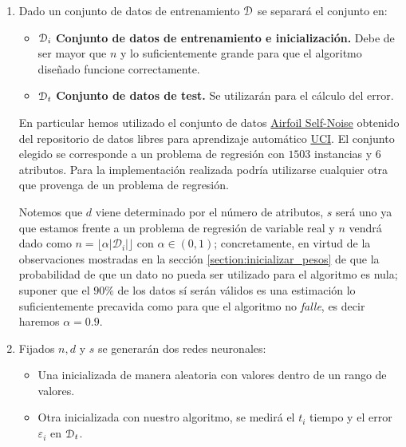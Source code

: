 \begin{enumerate}
\item Dado un conjunto de datos de entrenamiento $\mathcal{D}$  se separará el conjunto en:
\begin{itemize}
    \item $\mathcal{D}_i$ \textbf{Conjunto de 
    datos de entrenamiento e inicialización.} Debe de ser mayor que 
    $n$ y lo suficientemente grande para que el algoritmo diseñado funcione correctamente. 

    \item $\mathcal{D}_t$ \textbf{Conjunto de 
    datos de test.} Se utilizarán para el cálculo del error. 
\end{itemize} 

En particular hemos utilizado el conjunto de datos \href{https://archive.ics.uci.edu/ml/datasets/Airfoil+Self-Noise
    }{
        Airfoil Self-Noise} obtenido del repositorio de datos libres para aprendizaje automático \href{https://archive.ics.uci.edu/ml/datasets.php}{UCI}. 
El conjunto elegido se corresponde a un problema de regresión con $1503$ instancias y $6$ atributos. 
Para la implementación realizada podría utilizarse cualquier otra que provenga de un problema de regresión. 

Notemos que $d$ viene determinado por el número de atributos, 
$s$ será uno ya que estamos frente a un problema 
de regresión de variable real y $n$ vendrá dado como $n = \lfloor \alpha |\mathcal{D}_i| \rfloor$ con $\alpha \in (0,1)$; concretamente, en virtud de la observaciones mostradas en la 
sección \ref{section:inicializar_pesos} de que la probabilidad de 
que un dato no pueda ser utilizado para el algoritmo es nula; 
suponer que el $90\%$ de los datos sí serán válidos es una 
estimación lo suficientemente precavida como para que el algoritmo 
no \textit{falle}, es decir haremos    $\alpha = 0.9$. 

\item Fijados $n, d$ y $s$ se generarán dos redes neuronales: 

\begin{itemize}
    \item Una inicializada de manera aleatoria con valores dentro de un rango de valores. 
    
    \item  Otra inicializada con nuestro algoritmo, se medirá el $t_i$ tiempo y el error $\varepsilon_i$ en  $\mathcal{D}_t$. 
\end{itemize}


\end{enumerate}
